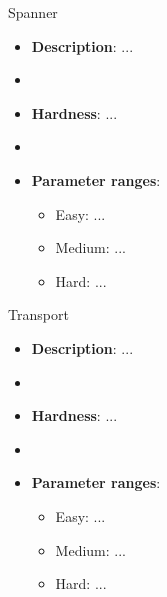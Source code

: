 \documentclass[aspectratio=169,xcolor=dvipsnames]{beamer}
\begin{document}
\begin{frame}{Spanner}

    \begin{itemize}
        \item \textbf{Description}: ...
        \item[]
        \item \textbf{Hardness}: ... 
        \item[]
        \item \textbf{Parameter ranges}: 
        \begin{itemize}
            \item Easy: ...
            \item Medium: ...
            \item Hard: ...
        \end{itemize}
    \end{itemize}
    
\end{frame}


\begin{frame}{Transport}

    \begin{itemize}
        \item \textbf{Description}: ...
        \item[]
        \item \textbf{Hardness}: ... 
        \item[]
        \item \textbf{Parameter ranges}: 
        \begin{itemize}
            \item Easy: ...
            \item Medium: ...
            \item Hard: ...
        \end{itemize}
    \end{itemize}
    
\end{frame}
\end{document}

